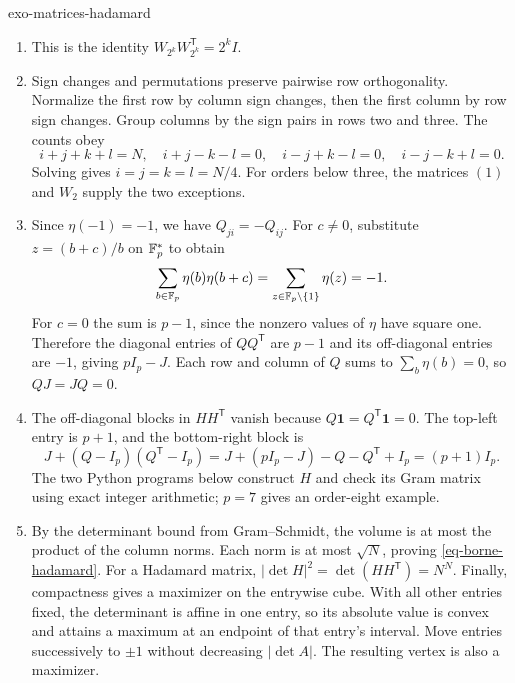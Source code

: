 \begin{correction}{exo-matrices-hadamard}
\begin{enumerate}
\item This is the identity $W_{2^k}W_{2^k}^{\mathsf T}=2^kI$.
\item Sign changes and permutations preserve pairwise row orthogonality.
Normalize the first row by column sign changes, then the first column by
row sign changes. Group columns by the sign pairs in rows two and three.
The counts obey
\[
 i+j+k+l=N,\quad i+j-k-l=0,\quad
 i-j+k-l=0,\quad i-j-k+l=0.
\]
Solving gives $i=j=k=l=N/4$. For orders below three, the matrices $(1)$ and
$W_2$ supply the two exceptions.
\item Since $\eta(-1)=-1$, we have $Q_{ji}=-Q_{ij}$.
For $c\neq0$, substitute $z=(b+c)/b$ on $\mathbb{F}_p^*$ to obtain
\[
 \sum_{b\in\mathbb{F}_p}\eta(b)\eta(b+c)
 =\sum_{z\in\mathbb{F}_p\setminus\{1\}}\eta(z)=-1.
\]
For $c=0$ the sum is $p-1$, since the nonzero values of $\eta$ have square
one. Therefore the diagonal entries of $QQ^{\mathsf T}$ are $p-1$ and its
off-diagonal entries are $-1$, giving $pI_p-J$.
Each row and column of $Q$ sums to $\sum_b\eta(b)=0$, so $QJ=JQ=0$.
\item The off-diagonal blocks in $HH^{\mathsf T}$ vanish because
$Q\mathbf1=Q^{\mathsf T}\mathbf1=0$.
The top-left entry is $p+1$, and the bottom-right block is
\[
 J+(Q-I_p)(Q^{\mathsf T}-I_p)
 =J+(pI_p-J)-Q-Q^{\mathsf T}+I_p=(p+1)I_p.
\]
The two Python programs below construct $H$ and check its Gram matrix
using exact integer arithmetic; $p=7$ gives an order-eight example.
\item By the determinant bound from Gram--Schmidt, the volume is at most
the product of the column norms. Each norm is at most $\sqrt N$, proving
\eqref{eq-borne-hadamard}. For a Hadamard matrix,
$|\det H|^2=\det(HH^{\mathsf T})=N^N$.
Finally, compactness gives a maximizer on the entrywise cube.
With all other entries fixed, the determinant is affine in one entry, so
its absolute value is convex and attains a maximum at an endpoint of that
entry's interval. Move entries successively to $\pm1$ without decreasing
$|\det A|$. The resulting vertex is also a maximizer.
\end{enumerate}
\begin{listing}[H]
\caption{The Paley construction for a prime $p\equiv3\pmod4$.}
\label{listing-matrixpaley}
\end{listing}
\begin{listing}[H]
\caption{Verifying the Paley construction at order $32$.}
\label{listing-testpaley}
\end{listing}
\end{correction}

